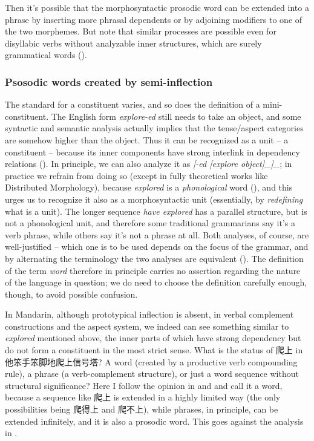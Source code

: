 \documentclass[UTF8, a4paper, oneside, scheme=plain, 12pt]{ctexrep}
\newcommand*{\citesec}[1]{\S~{#1}}
\newcommand*{\citepage}[1]{p.~{#1}}
\newcommand*{\term}[1]{\emph{#1}}
\newcommand{\form}[1]{\emph{#1}}
\begin{document}
Then it's possible that the morphosyntactic prosodic word can be extended into a phrase 
by inserting more phrasal dependents 
or by adjoining modifiers to one of the two morphemes.
But note that similar processes are possible even for 
disyllabic verbs without analyzable inner structures,
which are surely grammatical words ().

\subsubsection{Psosodic words created by semi-inflection}\label{sec:pos.architecture.word-confusing.constituent}

The standard for a constituent varies,
and so does the definition of a mini-constituent.
The English form \form{explore-ed} 
still needs to take an object, 
and some syntactic and semantic analysis 
actually implies that the tense/aspect categories are somehow higher than the object.
Thus it can be recognized as a unit -- a constituent -- because 
its inner components have strong interlink in dependency relations
().
In principle, we can also analyze it as 
\form{[-ed [explore \emph{object}]_{}]_{\text{\acs{tame} marking}}};
in practice we refrain from doing so
(except in fully theoretical works like Distributed Morphology), 
because \form{explored} is a \emph{phonological} word 
(),
and this urges us to recognize it also as a morphosyntactic unit
(essentially, by \emph{redefining} what is a unit).
The longer sequence \form{have explored} 
has a parallel structure, 
but is not a phonological unit, 
and therefore some traditional grammarians say it's a verb phrase,
while others say it's not a phrase at all. 
Both analyses, of course, are well-justified -- 
which one is to be used 
depends on the focus of the grammar,
and by alternating the terminology 
the two analyses are equivalent
().
The definition of the term \term{word} 
therefore in principle carries no assertion regarding 
the nature of the language in question; 
we do need to choose the definition carefully enough, though, 
to avoid possible confusion.

In Mandarin, although prototypical inflection is absent, 
in verbal complement constructions 
and the aspect system, 
we indeed can see something similar to \form{explored} mentioned above, 
the inner parts of which have strong dependency
but do not form a constituent in the most strict sense.
What is the status of 爬上 in 他笨手笨脚地爬上信号塔?
A word (created by a productive verb compounding rule), 
a phrase (a verb-complement structure),
or just a word sequence without structural significance?
Here I follow the opinion in \citep[\citepage{86}]{feng2000} and \citet{tham2015resultative}
and call it a word,
because a sequence like 爬上 is extended in a highly limited way 
(the only possibilities being 爬得上 and 爬不上),
while phrases, in principle, can be extended infinitely, 
and it is also a prosodic word.
This goes against the analysis in \citep[\citesec{1.2.7}]{zhudexigrammar}.
\end{document}
